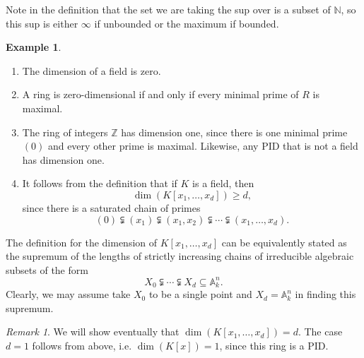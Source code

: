 \documentclass{amsart}[12pt]
\newcommand{\A}{\mathbb{A}}
\newcommand{\ZZ}{\mathbb{Z}}
\newcommand{\N}{\mathbb{N}}
\newcommand{\p}{{\mathfrak p}}
\numberwithin{equation}{section}
\theoremstyle{plain} %
\theoremstyle{definition}
\newtheorem{example}[equation]{Example}
\theoremstyle{remark}
\newtheorem{rem}[equation]{Remark}
\begin{document}
Note in the definition that the set we are taking the sup over is a subset of $\N$, so this sup is either $\infty$ if unbounded or the maximum if bounded.



\begin{example}
	\begin{enumerate}
		\item The dimension of a field is zero.
	\item A ring is zero-dimensional if and only if every minimal prime of $R$ is maximal.
	\item The ring of integers $\ZZ$ has dimension one, since there is one minimal prime $(0)$ and every other prime is maximal. Likewise, any PID that is not a field has dimension one.
%	
%	
	\item It follows from the definition that if $K$ is a field, then 
	\[\dim(K[x_1,\dots,x_d])\geq d,\] since there is a saturated chain of primes 
	\[(0) \subsetneqq (x_1)  \subsetneqq (x_1,x_2)  \subsetneqq \cdots  \subsetneqq (x_1,\dots,x_d).\]
	\end{enumerate}
	
The definition for the dimension of $K[x_1,\dots,x_d]$ can be equivalently stated as the supremum of the lengths of strictly increasing chains of irreducible algebraic subsets of the form 
$$
X_0 \subsetneqq \cdots \subsetneqq X_d \subseteq \A^n_k.
$$
Clearly, we may assume take $X_0$ to be a single point and $X_d = \A^n_k$ in finding this supremum.
\end{example}

\begin{rem}
We will show eventually that $\dim(K[x_1,\dots,x_d])=d$. The case $d=1$ follows from above, i.e. $\dim(K[x])=1$, since this ring is a PID.
\end{rem}
\end{document}
